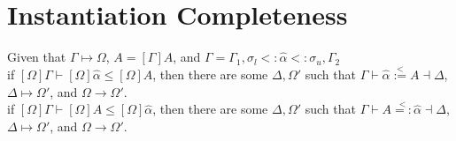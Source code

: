\documentclass{article}
\newcommand{\alphahat}{\hat{\alpha}}
\newcommand{\instr}{\overset{<}{=:}}
\newcommand{\instl}{\overset{<}{:=}}
\newcommand{\tst}{{\scriptstyle{<:}}}
\newcommand{\bound}[3]{#1 \tst #2 \tst #3}
\begin{document}
\section{Instantiation Completeness}

Given that $\Gamma \longmapsto \Omega$, $A=[\Gamma]A$, and $\Gamma = \Gamma_1,\bound{\sigma_l}{\alphahat}{\sigma_u},\Gamma_2$\\
if $[\Omega]\Gamma\vdash [\Omega]\alphahat \leq [\Omega]A$, then there are some $\Delta,\Omega'$ such that $\Gamma \vdash \alphahat \instl A \dashv \Delta$, $\Delta \longmapsto \Omega'$, and $\Omega \longrightarrow \Omega'$.\\
if $[\Omega]\Gamma\vdash [\Omega]A \leq [\Omega]\alphahat$, then there are some $\Delta,\Omega'$ such that $\Gamma \vdash A \instr \alphahat \dashv \Delta$, $\Delta \longmapsto \Omega'$, and $\Omega \longrightarrow \Omega'$.
\end{document}
